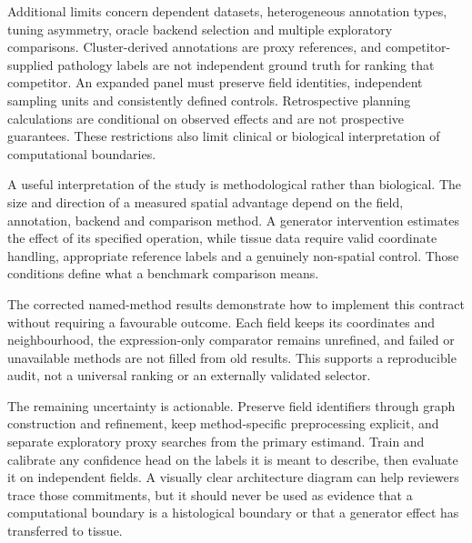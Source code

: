 \documentclass[journal]{IEEEtran}
\begin{document}
Additional limits concern dependent datasets, heterogeneous annotation types, tuning asymmetry, oracle backend selection and multiple exploratory comparisons. Cluster-derived annotations are proxy references, and competitor-supplied pathology labels are not independent ground truth for ranking that competitor. An expanded panel must preserve field identities, independent sampling units and consistently defined controls. Retrospective planning calculations are conditional on observed effects and are not prospective guarantees. These restrictions also limit clinical or biological interpretation of computational boundaries.


A useful interpretation of the study is methodological rather than biological. The size and direction of a measured spatial advantage depend on the field, annotation, backend and comparison method. A generator intervention estimates the effect of its specified operation, while tissue data require valid coordinate handling, appropriate reference labels and a genuinely non-spatial control. Those conditions define what a benchmark comparison means.

The corrected named-method results demonstrate how to implement this contract without requiring a favourable outcome. Each field keeps its coordinates and neighbourhood, the expression-only comparator remains unrefined, and failed or unavailable methods are not filled from old results. This supports a reproducible audit, not a universal ranking or an externally validated selector.

The remaining uncertainty is actionable. Preserve field identifiers through graph construction and refinement, keep method-specific preprocessing explicit, and separate exploratory proxy searches from the primary estimand. Train and calibrate any confidence head on the labels it is meant to describe, then evaluate it on independent fields. A visually clear architecture diagram can help reviewers trace those commitments, but it should never be used as evidence that a computational boundary is a histological boundary or that a generator effect has transferred to tissue.

\FloatBarrier
\end{document}
